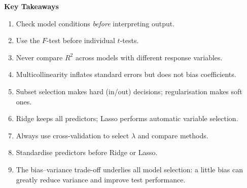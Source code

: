 \documentclass[12pt, a4paper]{article}
\begin{document}
\begin{keybox}
\noindent\textbf{Key Takeaways}\par\smallskip
\begin{enumerate}
  \item Check model conditions \emph{before} interpreting output.
  \item Use the $F$-test before individual $t$-tests.
  \item Never compare $R^2$ across models with different response variables.
  \item Multicollinearity inflates standard errors but does not bias coefficients.
  \item Subset selection makes hard (in/out) decisions; regularisation makes soft ones.
  \item Ridge keeps all predictors; Lasso performs automatic variable selection.
  \item Always use cross-validation to select $\lambda$ and compare methods.
  \item Standardise predictors before Ridge or Lasso.
  \item The bias--variance trade-off underlies all model selection: a little bias can greatly reduce variance and improve test performance.
\end{enumerate}
\end{keybox}
\end{document}

